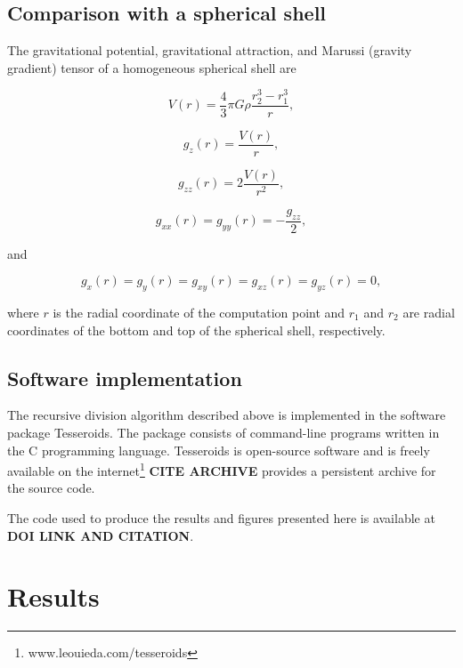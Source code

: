 \subsection{Comparison with a spherical shell}

The gravitational potential,
gravitational attraction,
and
Marussi (gravity gradient) tensor
of a homogeneous spherical shell
are \citep{Grombein2013}


\begin{equation}
V(r) = \frac{4}{3}\pi G \rho \frac{r_2^3 - r_1^3}{r},
\end{equation}

\begin{equation}
g_z(r) = \frac{V(r)}{r},
\end{equation}

\begin{equation}
g_{zz}(r) = 2\frac{V(r)}{r^2},
\end{equation}

\begin{equation}
g_{xx}(r) = g_{yy}(r) = -\frac{g_{zz}}{2},
\end{equation}

\noindent
and

\begin{equation}
g_x(r) = g_y(r) = g_{xy}(r) = g_{xz}(r) = g_{yz}(r) = 0,
\end{equation}

\noindent
where $r$ is the radial coordinate of the computation point and
$r_1$ and $r_2$ are radial coordinates
of the bottom and top of the spherical shell, respectively.


\subsection{Software implementation}

The recursive division algorithm described above
is implemented in the software package
Tesseroids.
The package consists
of command-line programs
written in the C programming language.
Tesseroids is open-source software
and is freely available
on the internet\footnote{www.leouieda.com/tesseroids}
\textbf{CITE ARCHIVE} provides a persistent
archive for the source code.

The code used to produce the results and figures presented here
is available at \textbf{DOI LINK AND CITATION}.


\section{Results}

